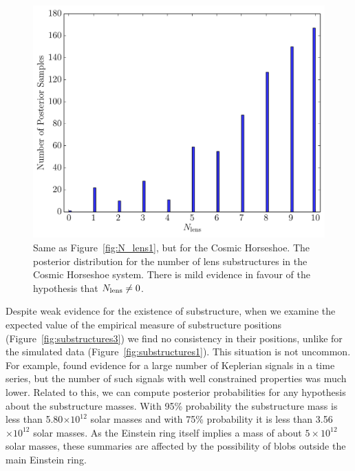 \documentclass[useAMS,usenatbib]{mn2e}
\newcommand{\revisions}{\color{blue}}
\begin{document}
\begin{figure}
\begin{center}
\includegraphics[scale=0.4]{N_lens3.pdf}
\caption{{\revisions Same as Figure~\ref{fig:N_lens1}, but for the Cosmic Horseshoe.} The posterior distribution for the number of lens substructures
in the Cosmic Horseshoe system. There is mild evidence in favour of the
hypothesis that $N_{\rm lens} \neq 0$.\label{fig:N_lens3}}
\end{center}
\end{figure}

Despite weak evidence for the existence of substructure, when we examine the
expected value of the empirical measure of substructure positions
(Figure~\ref{fig:substructures3}) we find no consistency in their positions,
unlike for the simulated data (Figure~\ref{fig:substructures1}). This situation
is not uncommon. For example, \citet{exoplanet} found evidence for a large
number of Keplerian signals in a time series, but the number of such signals
with well constrained properties was much lower. Related to this, we can
compute posterior probabilities for any hypothesis about the substructure
masses. With 95\% probability the substructure mass is less than 5.80$\times 10^{12}$ solar masses and with 75\% probability it is less than 3.56$\times 10^{12}$ solar masses. As the Einstein ring itself implies a mass of about $5 \times 10^{12}$
solar masses, these summaries are affected by the possibility of blobs outside
the main Einstein ring.
\end{document}
